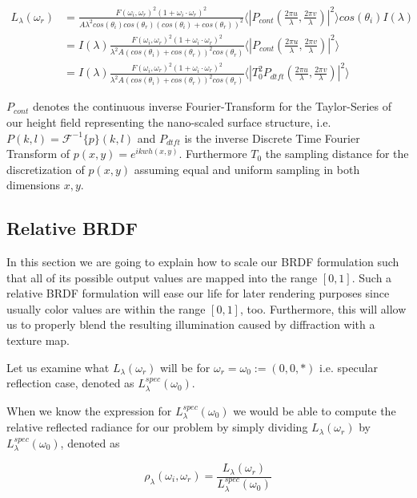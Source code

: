 \begin{align}
L_{\lambda}(\omega_r) 
& = \frac{F(\omega_i, \omega_r)^2 (1 + \omega_i \cdot \omega_r)^2}{A \lambda^2 cos(\theta_i)cos(\theta_r)  (cos(\theta_i)+cos(\theta_r))^2} \langle \left|P_{cont}(\frac{2\pi u}{\lambda}, \frac{2\pi v}{\lambda})  \right|^2\rangle cos(\theta_i) I(\lambda) \nonumber \\
& = I(\lambda) \frac{F(\omega_i, \omega_r)^2 (1 + \omega_i \cdot \omega_r)^2}{\lambda^2 A (cos(\theta_i)+cos(\theta_r))^2 cos(\theta_r)} \langle \left|P_{cont}(\frac{2\pi u}{\lambda}, \frac{2\pi v}{\lambda})  \right|^2\rangle \nonumber \\
& = I(\lambda) \frac{F(\omega_i, \omega_r)^2 (1 + \omega_i \cdot \omega_r)^2}{\lambda^2 A (cos(\theta_i)+cos(\theta_r))^2 cos(\theta_r)} \langle \left|T_0^2 P_{dtft}(\frac{2\pi u}{\lambda}, \frac{2\pi v}{\lambda})  \right|^2\rangle
\end{align}

$P_{cont}$ denotes the continuous inverse Fourier-Transform for the Taylor-Series of our height field representing the nano-scaled surface structure, i.e. $P(k,l) = \mathcal{F}^{-1}\{p\}(k,l)$ and $P_{dtft}$ is the inverse Discrete Time Fourier Transform of $p(x,y) = e^{ikwh(x,y)}$. Furthermore $T_0$ the sampling distance for the discretization of $p(x,y)$ assuming equal and uniform sampling in both dimensions $x,y$.

\subsection{Relative BRDF}
In this section we are going to explain how to scale our BRDF formulation such that all of its possible output values are mapped into the range $\left[0,1\right]$. Such a relative BRDF formulation will ease our life for later rendering purposes since usually color values are within the range $\left[0,1\right]$, too. Furthermore, this will allow us to properly blend the resulting illumination caused by diffraction with a texture map.

Let us examine what $L_\lambda(\omega_r)$ will be for $\omega_r = \omega_0 := (0,0,*)$ i.e. specular reflection case, denoted as $L_\lambda^{spec}(\omega_0)$. 

When we know the expression for $L_\lambda^{spec}(\omega_0)$ we would be able to compute the relative reflected radiance for our problem by simply dividing $L_\lambda(\omega_r)$ by $L_\lambda^{spec}(\omega_0)$, denoted as 

\begin{equation}
    \rho_\lambda(\omega_i,\omega_r) = \frac{L_\lambda(\omega_r)}{L_\lambda^{spec}(\omega_0)}
\end{equation}

